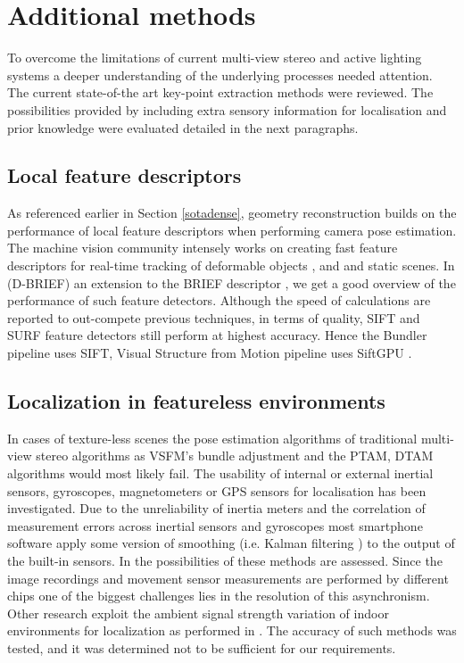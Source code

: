 \documentclass{ucl_thesis}
\begin{document}
\section{Additional methods}

\par To overcome the limitations of current multi-view stereo and active lighting systems a deeper understanding of the underlying processes needed attention. The current state-of-the art key-point extraction methods were reviewed. The possibilities provided by including extra sensory information for localisation and prior knowledge were evaluated detailed in the next paragraphs.

\subsection{Local feature descriptors} 
\label{section:featdesc}
As referenced earlier in Section \ref{sotadense}, geometry reconstruction builds on the performance of local feature descriptors when performing camera pose estimation. The machine vision community intensely works on creating fast feature descriptors for real-time tracking of deformable objects \cite{RussellFA12}, \cite{DBLP:dblp_conf/ismar/RoussosRGA12} and \cite{DBLP:dblp_conf/eccv/VicenteA12} and static scenes. In \cite{trzcinskiefficient} (D-BRIEF) an extension to the BRIEF descriptor \cite{calonder2010brief}, we get a good overview of the performance of such feature detectors. Although the speed of calculations are reported to out-compete previous techniques, in terms of quality, SIFT \cite{Lowe04} and SURF \cite{BayTG06} feature detectors still perform at highest accuracy. Hence the Bundler pipeline uses SIFT, Visual Structure from Motion pipeline uses SiftGPU \cite{siftgpu07wu}.

\subsection{Localization in featureless environments}
In cases of texture-less scenes the pose estimation algorithms of traditional multi-view stereo algorithms as VSFM's bundle adjustment and the PTAM, DTAM algorithms would most likely fail. The usability of internal or external inertial sensors, gyroscopes, magnetometers or GPS sensors for localisation has been investigated. Due to the unreliability of inertia meters and the correlation of measurement errors across inertial sensors and gyroscopes most smartphone software apply some version of smoothing (i.e. Kalman filtering \cite{kalman}) to the output of the built-in sensors. In \cite{HolzmannH12} the possibilities of these methods are assessed. Since the image recordings and movement sensor measurements are performed by different chips one of the biggest challenges lies in the resolution of this asynchronism. Other research exploit the ambient signal strength variation of indoor environments for localization as performed in \cite{xiong2011arraytrack}. The accuracy of such methods was tested, and it was determined not to be sufficient for our requirements.
\end{document}
